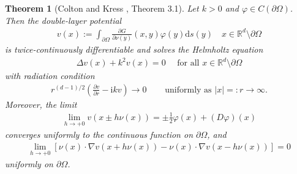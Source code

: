 \documentclass{article}
\theoremstyle{plain}
\newtheorem{thm}{Theorem}[section]
\theoremstyle{definition}
\begin{document}
\begin{thm}[Colton and Kress \cite{colton1998inverse}, Theorem 3.1]
    Let $k>0$ and $\varphi\in C(\partial\Omega)$. Then the double-layer potential
    \begin{align*}
        v(x) := \int_{\partial\Omega} \frac{\partial G}{\partial \nu(y)}(x,y)\varphi(y)\mathrm ds(y) \quad x\in\mathbb R^d\setminus\partial\Omega
    \end{align*}
    is twice-continuously differentiable and solves the Helmholtz equation
    \begin{align*}
        \varDelta v(x) + k^2 v(x) = 0 \quad \text{ for all }x\in \mathbb R^d\setminus\partial\Omega
    \end{align*}
    with radiation condition
    \begin{align*}
        r^{(d-1)/2}\left( \frac{\partial v}{\partial r} - \mathrm ikv\right) \to 0  \quad &\text{ uniformly as } |x|=:r\to\infty.
    \end{align*}
    Moreover, the limit
    \begin{align*}
        \lim_{h\to +0} v(x \pm h\nu(x)) = \pm \frac{1}{2}\varphi(x) + (D\varphi)(x)
    \end{align*}
    converges uniformly to the continuous function on $\partial\Omega$, and
    \begin{align*}
        \lim_{h\to +0} \left[
            \nu(x)\cdot \nabla v(x + h\nu(x)) - \nu(x)\cdot \nabla v(x - h\nu(x))
        \right] = 0
    \end{align*}
    uniformly on $\partial\Omega$.
\end{thm}



\end{document}
